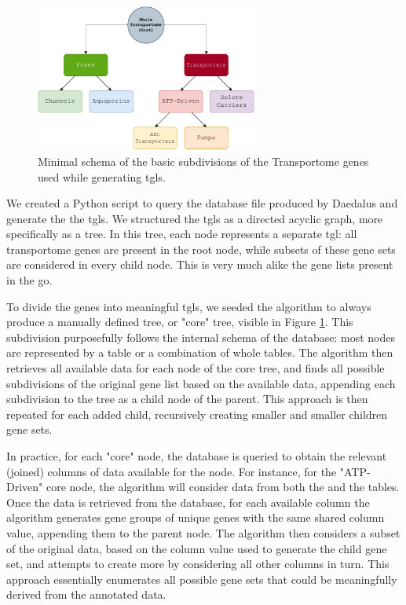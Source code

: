 \begin{figure}
    \centering
    \includegraphics[width=0.65\textwidth]{resources/images/BasicTree.pdf}
    \caption{Minimal schema of the basic subdivisions of the Transportome genes used while generating \glspl{tgl}.}
    \label{fig:BasicTree}
\end{figure}

We created a Python script to query the database file produced by Daedalus and generate the the \glspl{tgl}. We structured the \glspl{tgl} as a directed acyclic graph, more specifically as a tree. In this tree, each node represents a separate \gls{tgl}: all transportome genes are present in the root node, while subsets of these gene sets are considered in every child node. This is very much alike the gene lists present in the \gls{go}.

To divide the genes into meaningful \glspl{tgl}, we seeded the algorithm to always produce a manually defined tree, or "core" tree, visible in Figure \ref{fig:BasicTree}. This subdivision purposefully follows the internal schema of the database: most nodes are represented by a table or a combination of whole tables. The algorithm then retrieves all available data for each node of the core tree, and finds all possible subdivisions of the original gene list based on the available data, appending each subdivision to the tree as a child node of the parent. This approach is then repeated for each added child, recursively creating smaller and smaller children gene sets.

In practice, for each "core" node, the database is queried to obtain the relevant (joined) columns of data available for the node. For instance, for the "ATP-Driven" core node, the algorithm will consider data from both the  and the  tables. Once the data is retrieved from the database, for each available column the algorithm generates gene groups of unique genes with the same shared column value, appending them to the parent node. The algorithm then considers a subset of the original data, based on the column value used to generate the child gene set, and attempts to create more by considering all other columns in turn. This approach essentially enumerates all possible gene sets that could be meaningfully derived from the annotated data. 

